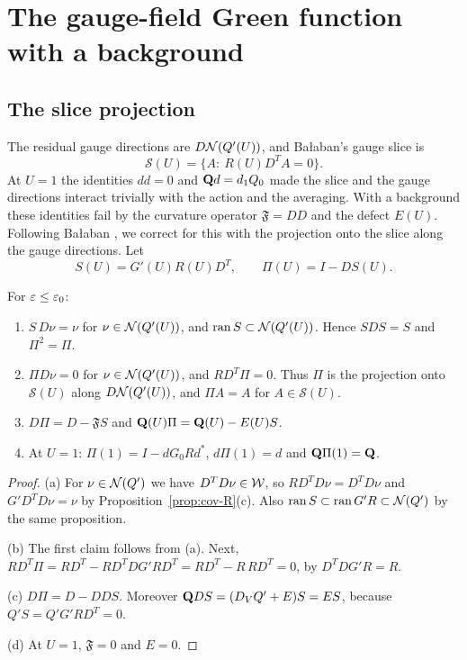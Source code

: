\section{The gauge-field Green function with a background}\label{sec:cov-gauge}

\subsection{The slice projection}\label{ss:15.1}

The residual gauge directions are $D\mathcal N(Q'(U))$, and Ba\l aban's gauge slice is
\[
\mathcal S(U)=\{A:\ R(U)D^TA=0\}.
\]
At $U=1$ the identities $dd=0$ and $\mathbf Q d=d_1 Q_0$ made the slice and the gauge directions interact trivially with the action and the averaging. With a background these identities fail by the curvature operator $\mathfrak F=DD$ and the defect $E(U)$. Following Ba\l aban \cite[(3.118)--(3.119)]{BalBackground}, we correct for this with the projection onto the slice along the gauge directions. Let
\[
S(U)=G'(U)R(U)D^T,\qquad \Pi(U)=I-DS(U).
\]

\begin{lemma}\label{lem:slice}
For $\varepsilon\le\varepsilon_0$:
\begin{enumerate}[label=(\alph*)]
\item $S\,D\nu=\nu$ for $\nu\in\mathcal N(Q'(U))$, and $\operatorname{ran} S\subset\mathcal N(Q'(U))$. Hence $SDS=S$ and $\Pi^2=\Pi$.
\item $\Pi D\nu=0$ for $\nu\in\mathcal N(Q'(U))$, and $RD^T\Pi=0$. Thus $\Pi$ is the projection onto $\mathcal S(U)$ along $D\mathcal N(Q'(U))$, and $\Pi A=A$ for $A\in\mathcal S(U)$.
\item $D\Pi=D-\mathfrak FS$ and $\mathbf Q(U)\Pi=\mathbf Q(U)-E(U)S$.
\item At $U=1$: $\Pi(1)=I-dG_0Rd^*$, $d\Pi(1)=d$ and $\mathbf Q\Pi(1)=\mathbf Q$.
\end{enumerate}
\end{lemma}

\begin{proof}
(a) For $\nu\in\mathcal N(Q')$ we have $D^TD\nu\in\mathcal W$, so $RD^TD\nu=D^TD\nu$ and $G'D^TD\nu=\nu$ by Proposition~\ref{prop:cov-R}(c). Also $\operatorname{ran} S\subset\operatorname{ran} G'R\subset\mathcal N(Q')$ by the same proposition.

(b) The first claim follows from (a). Next, $RD^T\Pi=RD^T-RD^TDG'RD^T=RD^T-R\,RD^T=0$, by $D^TDG'R=R$.

(c) $D\Pi=D-DDS$. Moreover $\mathbf Q DS=(D_VQ'+E)S=ES$, because $Q'S=Q'G'RD^T=0$.

(d) At $U=1$, $\mathfrak F=0$ and $E=0$.
\end{proof}

